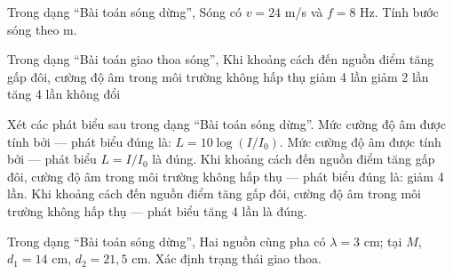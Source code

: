 \begin{ex}
Trong dạng “Bài toán sóng dừng”, Sóng có $v=24$ m/s và $f=8$ Hz. Tính bước sóng theo m.
\end{ex}

\begin{ex}
Trong dạng “Bài toán giao thoa sóng”, Khi khoảng cách đến nguồn điểm tăng gấp đôi, cường độ âm trong môi trường không hấp thụ
\choice
{\True giảm 4 lần}
{giảm 2 lần}
{tăng 4 lần}
{không đổi}
\end{ex}

\begin{ex}
Xét các phát biểu sau trong dạng “Bài toán sóng dừng”.
\choiceTF
{\True Mức cường độ âm được tính bởi — phát biểu đúng là: $L=10\log(I/I_0)$.}
{Mức cường độ âm được tính bởi — phát biểu $L=I/I_0$ là đúng.}
{\True Khi khoảng cách đến nguồn điểm tăng gấp đôi, cường độ âm trong môi trường không hấp thụ — phát biểu đúng là: giảm 4 lần.}
{Khi khoảng cách đến nguồn điểm tăng gấp đôi, cường độ âm trong môi trường không hấp thụ — phát biểu tăng 4 lần là đúng.}
\end{ex}

\begin{ex}
Trong dạng “Bài toán sóng dừng”, Hai nguồn cùng pha có $\lambda=3$ cm; tại $M$, $d_1=14$ cm, $d_2=21,5$ cm. Xác định trạng thái giao thoa.
\choiceTF

\end{ex}

